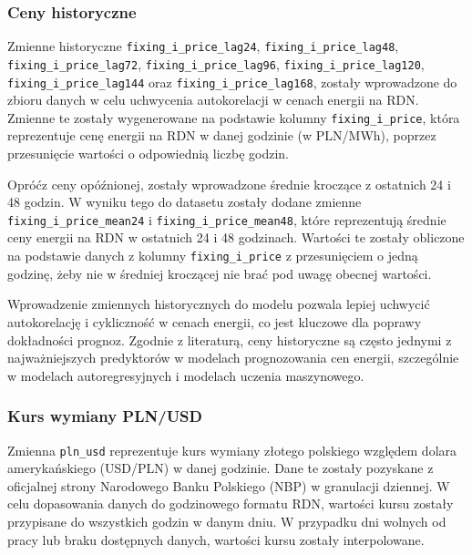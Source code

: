 \subsubsection{Ceny historyczne}
\label{subsec:historical_prices}
 
Zmienne historyczne \texttt{fixing\_i\_price\_lag24}, \texttt{fixing\_i\_price\_lag48}, \texttt{fixing\_i\_price\_lag72}, \texttt{fixing\_i\_price\_lag96}, \texttt{fixing\_i\_price\_lag120}, \texttt{fixing\_i\_price\_lag144} oraz \newline \texttt{fixing\_i\_price\_lag168}, zostały wprowadzone do zbioru danych w celu uchwycenia autokorelacji w cenach energii na RDN. Zmienne te zostały wygenerowane na podstawie kolumny \texttt{fixing\_i\_price}, która reprezentuje cenę energii na RDN w danej godzinie (w PLN/MWh), poprzez przesunięcie wartości o odpowiednią liczbę godzin. 

Opróćz ceny opóźnionej, zostały wprowadzone średnie kroczące z ostatnich 24 i 48 godzin. W wyniku tego do datasetu zostały dodane zmienne \texttt{fixing\_i\_price\_mean24} i \texttt{fixing\_i\_price\_mean48}, które reprezentują średnie ceny energii na RDN w ostatnich 24 i 48 godzinach. Wartości te zostały obliczone na podstawie danych z kolumny \texttt{fixing\_i\_price} z przesunięciem o jedną godzinę, żeby nie w średniej kroczącej nie brać pod uwagę obecnej wartości. 

Wprowadzenie zmiennych historycznych do modelu pozwala lepiej uchwycić autokorelację i cykliczność w cenach energii, co jest kluczowe dla poprawy dokładności prognoz. Zgodnie z literaturą, ceny historyczne są często jednymi z najważniejszych predyktorów w modelach prognozowania cen energii, szczególnie w modelach autoregresyjnych i modelach uczenia maszynowego.

\subsubsection{Kurs wymiany PLN/USD}
\label{subsec:pln_usd}

Zmienna \texttt{pln\_usd} reprezentuje kurs wymiany złotego polskiego względem dolara amerykańskiego (USD/PLN) w danej godzinie. Dane te zostały pozyskane z oficjalnej strony Narodowego Banku Polskiego (NBP) w granulacji dziennej. W celu dopasowania danych do godzinowego formatu RDN, wartości kursu zostały przypisane do wszystkich godzin w danym dniu. W przypadku dni wolnych od pracy lub braku dostępnych danych, wartości kursu zostały interpolowane.

